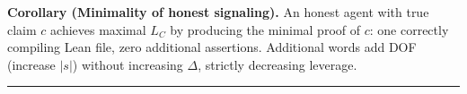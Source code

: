 \textbf{Corollary (Minimality of honest signaling).} An honest agent with true claim $c$
achieves maximal $L_C$ by producing the minimal proof of $c$: one correctly compiling Lean
file, zero additional assertions. Additional words add DOF (increase $|s|$) without increasing $\Delta$,
strictly decreasing leverage.

\begin{center}\rule{0.5\linewidth}{0.5pt}\end{center}
